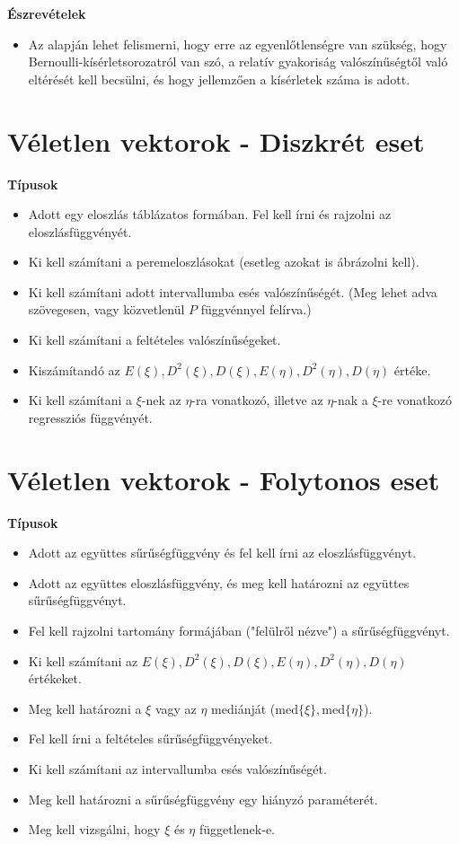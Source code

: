 \documentclass[a4paper]{article}
\begin{document}
\noindent \textbf{Észrevételek}

\begin{itemize}
\item Az alapján lehet felismerni, hogy erre az egyenlőtlenségre van szükség, hogy Bernoulli-kísérletsorozatról van szó, a relatív gyakoriság valószínűségtől való eltérését kell becsülni, és hogy jellemzően a kísérletek száma is adott.
\end{itemize}

\section{Véletlen vektorok - Diszkrét eset}

\noindent \textbf{Típusok}

\begin{itemize}
\item Adott egy eloszlás táblázatos formában. Fel kell írni és rajzolni az eloszlásfüggvényét.
\item Ki kell számítani a peremeloszlásokat (esetleg azokat is ábrázolni kell).
\item Ki kell számítani adott intervallumba esés valószínűségét. (Meg lehet adva szövegesen, vagy közvetlenül $P$ függvénnyel felírva.)
\item Ki kell számítani a feltételes valószínűségeket.
\item Kiszámítandó az $E(\xi), D^2(\xi), D(\xi), E(\eta), D^2(\eta), D(\eta)$ értéke.
\item Ki kell számítani a $\xi$-nek az $\eta$-ra vonatkozó, illetve az $\eta$-nak a $\xi$-re vonatkozó regressziós függvényét.
\end{itemize}

\section{Véletlen vektorok - Folytonos eset}

\noindent \textbf{Típusok}

\begin{itemize}
\item Adott az együttes sűrűségfüggvény és fel kell írni az eloszlásfüggvényt.
\item Adott az együttes eloszlásfüggvény, és meg kell határozni az együttes sűrűségfüggvényt.
\item Fel kell rajzolni tartomány formájában ("felülről nézve") a sűrűségfüggvényt.
\item Ki kell számítani az $E(\xi), D^2(\xi), D(\xi), E(\eta), D^2(\eta), D(\eta)$ értékeket.
\item Meg kell határozni a $\xi$ vagy az $\eta$ mediánját ($\text{med}\{\xi\}, \text{med}\{\eta\}$).
\item Fel kell írni a feltételes sűrűségfüggvényeket.
\item Ki kell számítani az intervallumba esés valószínűségét.
\item Meg kell határozni a sűrűségfüggvény egy hiányzó paraméterét.
\item Meg kell vizsgálni, hogy $\xi$ és $\eta$ függetlenek-e.
\end{itemize}
\end{document}
